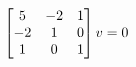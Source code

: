 \documentclass[preview]{standalone}
\begin{document}
\begin{align*}
\special{dvisvgm:raw <g id='unique000'>}\begin{bmatrix} 5 & -2 & 1 \\ -2 & 1 & 0 \\ 1 & 0 & 1 \end{bmatrix} v = 0\special{dvisvgm:raw </g>}
\end{align*}
\end{document}

